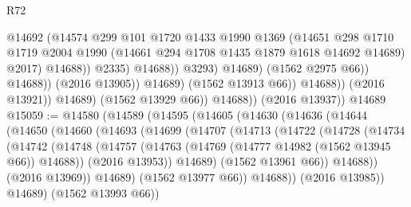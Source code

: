 \begin{lexlean}{R72}
\begin{coremodule}
                                            @14692
                                            (@14574
                                              @299
                                              @101
                                              @1720
                                              @1433
                                              @1990
                                              @1369
                                              (@14651
                                                @298
                                                @1710
                                                @1719
                                                @2004
                                                @1990
                                                (@14661 @294 @1708 @1435 @1879 @1618 @14692 @14689)
                                                @2017)
                                              @14688))
                                          @2335)
                                        @14688))
                                    @3293)
                                  @14689)
                                (@1562 @2975 @66))
                              @14688))
                          (@2016 @13905))
                        @14689)
                      (@1562 @13913 @66))
                    @14688))
                (@2016 @13921))
              @14689)
            (@1562 @13929 @66))
          @14688))
      (@2016 @13937))
    @14689
@15059 := @14580
    (@14589
      (@14595
        (@14605
          (@14630
            (@14636
              (@14644
                (@14650
                  (@14660
                    (@14693
                      (@14699
                        (@14707
                          (@14713
                            (@14722
                              (@14728
                                (@14734
                                  (@14742
                                    (@14748
                                      (@14757
                                        (@14763 (@14769 (@14777 @14982 (@1562 @13945 @66)) @14688))
                                        (@2016 @13953))
                                      @14689)
                                    (@1562 @13961 @66))
                                  @14688))
                              (@2016 @13969))
                            @14689)
                          (@1562 @13977 @66))
                        @14688))
                    (@2016 @13985))
                  @14689)
                (@1562 @13993 @66))

\end{coremodule}
\end{lexlean}
